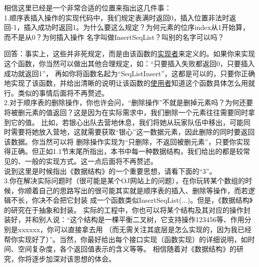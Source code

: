 \begin{insightbox}
    相信这里已经是一个非常合适的位置来指出这几件事：
    \\
    
1.顺序表插入操作的实现代码中，我们规定表满时返回0，插入位置非法时返回-1，插入成功时返回1。为什么要这么规定？为何元素的位序index从1开始算，而不是从0？为何插入操作
名字叫做InsertSeqList？叫别的名字可以吗？
    
    回答：事实上，这些并非死规定，而是由该函数的\uline{实现者}来定义的。如果你来实现这个函数，你当然可以做出其他合理规定，如：“只要插入失败都返回0，只要插入成功就返回1”，
    再如你将函数名起为“SeqListInsert”，这都是可以的，只要你正确地实现了该函数，并给出清晰的说明让该函数的\uline{使用者}知道这个函数具体怎么用就行。类似的事情后面将不再赘述。
    \\
    
2.对于顺序表的删除操作，你也许会问，“删除操作”不就是删掉元素吗？为何还要将被删元素的值返回？这是因为在实际需求中，我们删除一个元素往往需要同时拿到它的值。
    比如，若银心出队去营地休息，我们将她从玩家队伍中移出，可能同时需要将她放入营地，这就需要获取“银心”这一数据元素，因此删除的同时要返回该数据。你当然可以将
    删除操作实现为“只删除，不返回被删元素”，只要你实现得正确。但正如1.1节末尾所指出，本书中每一种数据结构，我们给出的都是较常见的、一般的实现方式。这一点后面将不再赘述。
    \\

    说到这里是时候指出《数据结构》的一个重要思想，请看下面的“3”。
    \\

3.你在解决实际问题时（很可能是某个OJ网站上的问题），在你玩转某个数组的时候，你顺着自己的思路写出的很可能其实就是顺序表的插入、删除等操作，而若逻辑不长，你决不会把它封装
    成一个函数类似InsertSeqList(...)。但是，《数据结构》的研究在于抽象和封装。
    实际的工程中，你也可以将某个结构及其对应的操作封装好，并和别人说：“这个结构是一棵平衡二叉树，它支持操作123456等、作用分别是xxxxxx，你可以直接拿去用
    （而无需关注其底层是怎么实现的，因为我已经帮你实现好了）”。当然，你最好给出每个接口实现（函数实现）的详细说明，如时间、空间复杂度，各个返回值表示的含义等等。
    相信随着对《数据结构》的研究，你将逐步加深对该思想的体会。
    
\end{insightbox}

